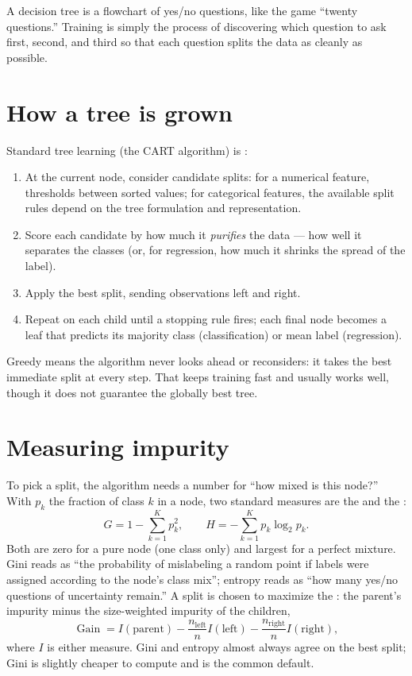 \begin{intuition}
A decision tree is a flowchart of yes/no questions, like the game ``twenty questions.'' Training is simply the process of discovering which question to ask first, second, and third so that each question splits the data as cleanly as possible.
\end{intuition}

\section{How a tree is grown}
\label{sec:decision-tree}

Standard tree learning (the CART algorithm) is :

\begin{enumerate}
  \item At the current node, consider candidate splits: for a numerical feature, thresholds between sorted values; for categorical features, the available split rules depend on the tree formulation and representation.
  \item Score each candidate by how much it \emph{purifies} the data --- how well it separates the classes (or, for regression, how much it shrinks the spread of the label).
  \item Apply the best split, sending observations left and right.
  \item Repeat on each child until a stopping rule fires; each final node becomes a leaf that predicts its majority class (classification) or mean label (regression).
\end{enumerate}

Greedy means the algorithm never looks ahead or reconsiders: it takes the best immediate split at every step. That keeps training fast and usually works well, though it does not guarantee the globally best tree.

\section{Measuring impurity}

To pick a split, the algorithm needs a number for ``how mixed is this node?'' With $p_k$ the fraction of class $k$ in a node, two standard measures are the  and the :
\[
  G=1-\sum_{k=1}^{K}p_k^2,
  \qquad
  H=-\sum_{k=1}^{K}p_k\log_2 p_k.
\]
Both are zero for a pure node (one class only) and largest for a perfect mixture. Gini reads as ``the probability of mislabeling a random point if labels were assigned according to the node's class mix''; entropy reads as ``how many yes/no questions of uncertainty remain.'' A split is chosen to maximize the : the parent's impurity minus the size-weighted impurity of the children,
\[
  \operatorname{Gain}
  =I(\text{parent})
  -\frac{n_{\mathrm{left}}}{n}I(\text{left})
  -\frac{n_{\mathrm{right}}}{n}I(\text{right}),
\]
where $I$ is either measure. Gini and entropy almost always agree on the best split; Gini is slightly cheaper to compute and is the common default.

